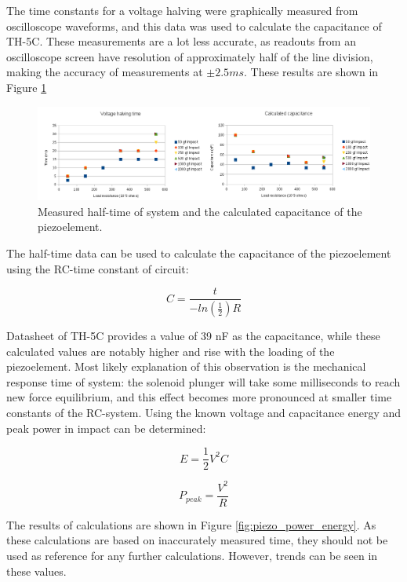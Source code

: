 The time constants for a voltage halving were graphically measured from oscilloscope waveforms, and this data was used to calculate the capacitance of TH-5C. These measurements are a lot less accurate, as readouts from an oscilloscope screen have resolution of approximately half of the line division, making the accuracy of measurements at $\pm 2.5 ms$. These results are shown in Figure \ref{fig:piezo_time_capacitance}

\begin{figure}[htb]
  \begin{center}
  \includegraphics[width=\columnwidth]{images/own_measurement/piezo_capacitance}
  \end{center}
  \caption{Measured half-time of system and the calculated capacitance of the piezoelement.}
  \label{fig:piezo_time_capacitance}
\end{figure}

The half-time data can be used to calculate the capacitance of the piezoelement using the RC-time constant of circuit:

\begin{equation}
  C=\frac{t}{-ln(\frac{1}{2})R} 
\end{equation}

Datasheet of TH-5C provides a value of 39 nF as the capacitance, while these calculated values are notably higher and rise with the loading of the piezoelement. Most likely explanation of this observation is the mechanical response time of system: the solenoid plunger will take some milliseconds to reach new force equilibrium, and this effect becomes more pronounced at smaller time constants of the RC-system. Using the known voltage and capacitance energy and peak power in impact can be determined:
 
\begin{equation}
   E = \frac{1}{2}V^2C
\end{equation}

\begin{equation}
   P_{peak} = \frac{V^2}{R}
\end{equation}
 
The results of calculations are shown in Figure \ref{fig:piezo_power_energy}. As these calculations are based on inaccurately measured time, they should not be used as reference for any further calculations. However, trends can be seen in these values. 
 
